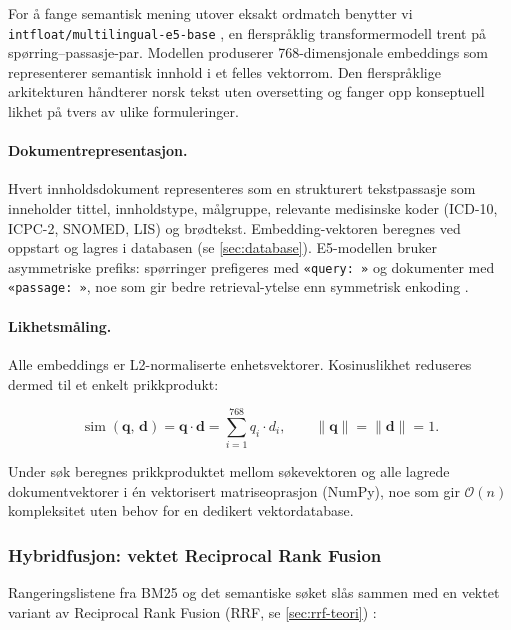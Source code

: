 For å fange semantisk mening utover eksakt ordmatch benytter vi
\texttt{intfloat/multilingual-e5-base} \cite{wang2024multilingual}, en
flerspråklig transformermodell trent på spørring--passasje-par. Modellen
produserer 768-dimensjonale embeddings som representerer semantisk innhold i
et felles vektorrom. Den flerspråklige arkitekturen håndterer norsk tekst uten
oversetting og fanger opp konseptuell likhet på tvers av ulike formuleringer.

\paragraph{Dokumentrepresentasjon.}
Hvert innholdsdokument representeres som en strukturert tekstpassasje som
inneholder tittel, innholdstype, målgruppe, relevante medisinske koder
(ICD-10, ICPC-2, SNOMED, LIS) og brødtekst. Embedding-vektoren beregnes ved
oppstart og lagres i databasen (se \autoref{sec:database}).
E5-modellen bruker asymmetriske prefiks: spørringer prefigeres med
\texttt{«query:~»} og dokumenter med \texttt{«passage:~»}, noe som gir bedre
retrieval-ytelse enn symmetrisk enkoding \cite{wang2024multilingual}.

\paragraph{Likhetsmåling.}
Alle embeddings er L2-normaliserte enhetsvektorer. Kosinuslikhet reduseres
dermed til et enkelt prikkprodukt:

\begin{equation}
\operatorname{sim}(\mathbf{q},\, \mathbf{d})
= \mathbf{q} \cdot \mathbf{d}
= \sum_{i=1}^{768} q_i \cdot d_i,
\qquad \|\mathbf{q}\| = \|\mathbf{d}\| = 1.
\end{equation}

Under søk beregnes prikkproduktet mellom søkevektoren og alle lagrede
dokumentvektorer i én vektorisert matriseoprasjon (NumPy), noe som gir
$\mathcal{O}(n)$ kompleksitet uten behov for en dedikert vektordatabase.

\subsubsection{Hybridfusjon: vektet Reciprocal Rank Fusion}
\label{sec:rrf-impl}

Rangeringslistene fra BM25 og det semantiske søket slås sammen med en vektet
variant av Reciprocal Rank Fusion
(RRF, se \autoref{sec:rrf-teori}) \cite{cormack2009reciprocal}:


